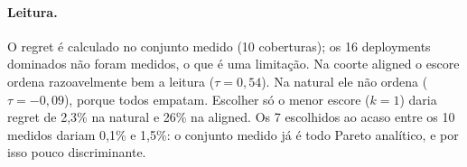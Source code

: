 \paragraph{Leitura.} O regret é calculado no conjunto medido (10 coberturas); os 16 deployments dominados não foram medidos, o que é uma limitação. Na coorte aligned o escore ordena razoavelmente bem a leitura ($\tau=0{,}54$). Na natural ele não ordena ($\tau=-0{,}09$), porque todos empatam. Escolher só o menor escore ($k=1$) daria regret de 2,3\% na natural e 26\% na aligned. Os 7 escolhidos ao acaso entre os 10 medidos dariam 0,1\% e 1,5\%: o conjunto medido já é todo Pareto analítico, e por isso pouco discriminante.
